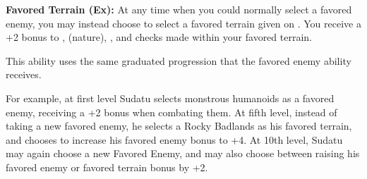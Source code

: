 

\textbf{Favored Terrain (Ex):} At any time when you could normally select a favored enemy, you may instead choose to select a favored terrain given on . You receive a +2 bonus to ,  (nature), ,  and  checks made within your favored terrain.

This ability uses the same graduated progression that the favored enemy ability receives.

For example, at first level Sudatu selects monstrous humanoids as a favored enemy, receiving a +2 bonus when combating them. At fifth level, instead of taking a new favored enemy, he selects a Rocky Badlands as his favored terrain, and chooses to increase his favored enemy bonus to +4. At 10th level, Sudatu may again choose a new Favored Enemy, and may also choose between raising his favored enemy or favored terrain bonus by +2.

